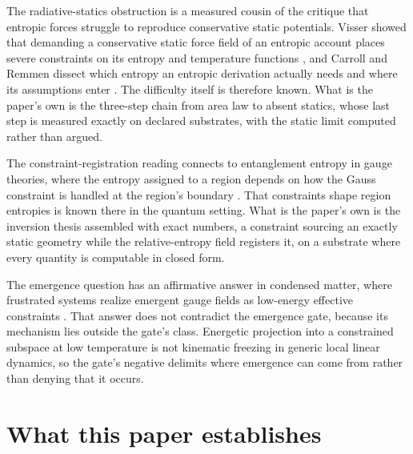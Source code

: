 \documentclass[aps,pre,reprint,nofootinbib]{revtex4-2}
\begin{document}
The radiative-statics obstruction is a measured cousin of the
critique that entropic forces struggle to reproduce conservative
static potentials.  Visser showed that demanding a conservative
static force field of an entropic account places severe constraints
on its entropy and temperature functions \cite{Visser2011}, and
Carroll and Remmen dissect which entropy an entropic derivation
actually needs and where its assumptions enter
\cite{CarrollRemmen2016}.  The difficulty itself is therefore known.
What is the paper's own is the three-step chain from area law to
absent statics, whose last step is measured exactly on declared
substrates, with the static limit computed rather than argued.

The constraint-registration reading connects to entanglement
entropy in gauge theories, where the entropy assigned to a region
depends on how the Gauss constraint is handled at the region's
boundary \cite{CasiniHuertaRosabal2014}.  That constraints shape
region entropies is known there in the quantum setting.  What is
the paper's own is the inversion thesis assembled with exact
numbers, a constraint sourcing an exactly static geometry while the
relative-entropy field registers it, on a substrate where every
quantity is computable in closed form.

The emergence question has an affirmative answer in condensed
matter, where frustrated systems realize emergent gauge fields as
low-energy effective constraints \cite{Sachdev2019}.  That answer
does not contradict the emergence gate, because its mechanism lies
outside the gate's class.  Energetic projection into a constrained
subspace at low temperature is not kinematic freezing in generic
local linear dynamics, so the gate's negative delimits where
emergence can come from rather than denying that it occurs.

\section{What this paper establishes}
\label{sec:claims}
\end{document}
